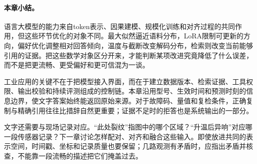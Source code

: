 \paragraph{本章小结。}
语言大模型的能力来自token表示、因果建模、规模化训练和对齐过程的共同作用，但这些环节优化的对象不同。最大似然逼近语料分布，LoRA限制可更新的方向，偏好优化调整相对回答倾向，温度与截断改变解码分布，检索则改变当前能够引用的证据。把这些数学对象区分开来，才能判断某项改进究竟降低了什么误差，而不是把更流畅、更受偏好和更可信混为一谈。

工业应用的关键不在于把模型接入界面，而在于建立数据版本、检索证据、工具权限、输出校验和持续评测组成的控制链。本章沿用型号、生效时间和预测时刻的信息边界，使文字答案始终能返回原始来源。对于故障码、量值和复检条件，正确复制与精确引用往往比措辞自然更重要；证据不足时的拒答也是系统输出的一部分。

文字还需要与现场记录对应。“此处裂纹”指图中的哪个区域？“升温后异响”对应哪一段传感器记录？下一章讨论怎样配对、对齐和融合这些输入。即使放进共同的表示空间，时间戳、坐标和记录质量也要保留；几路观测有矛盾时，应指出矛盾并核查，不能靠一段流畅的描述把它们掩盖过去。
